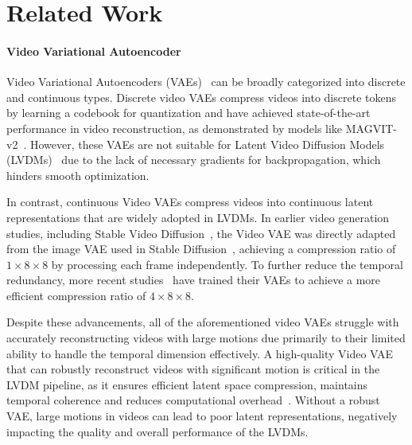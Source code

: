 \section{Related Work}
\label{sec:relat}

\paragraph{Video Variational Autoencoder} Video Variational Autoencoders (VAEs)~\cite{kingma2014auto} can be broadly categorized into discrete and continuous types. Discrete video VAEs compress videos into discrete tokens by learning a codebook for quantization and have achieved state-of-the-art performance in video reconstruction, as demonstrated by models like MAGVIT-v2~\cite{yu2023language}. However, these VAEs are not suitable for Latent Video Diffusion Models (LVDMs)~\cite{he-lvdm} due to the lack of necessary gradients for backpropagation, which hinders smooth optimization.

In contrast, continuous Video VAEs compress videos into continuous latent representations that are widely adopted in LVDMs. 
In earlier video generation studies, including Stable Video Diffusion~\cite{blattmann2023stable}, the Video VAE was directly adapted from the image VAE used in Stable Diffusion~\cite{rombach2022high}, achieving a compression ratio of $1 \times 8 \times 8$  by processing each frame independently. 
To further reduce the temporal redundancy, more recent studies~\cite{zhao2024cv,pku_yuan_lab_and_tuzhan_ai_etc_2024_10948109,opensora,xu2024easyanimatehighperformancelongvideo,yang2024cogvideox} have trained their VAEs to achieve a more efficient compression ratio of $4 \times 8 \times 8$. 

Despite these advancements, all of the aforementioned video VAEs struggle with accurately reconstructing videos with large motions due primarily to their limited ability to handle the temporal dimension effectively. A high-quality Video VAE that can robustly reconstruct videos with significant motion is critical in the LVDM pipeline, as it ensures efficient latent space compression, maintains temporal coherence and reduces computational overhead~\cite{metamoviegen}. Without a robust VAE, large motions in videos can lead to poor latent representations, negatively impacting the quality and overall performance of the LVDMs.

